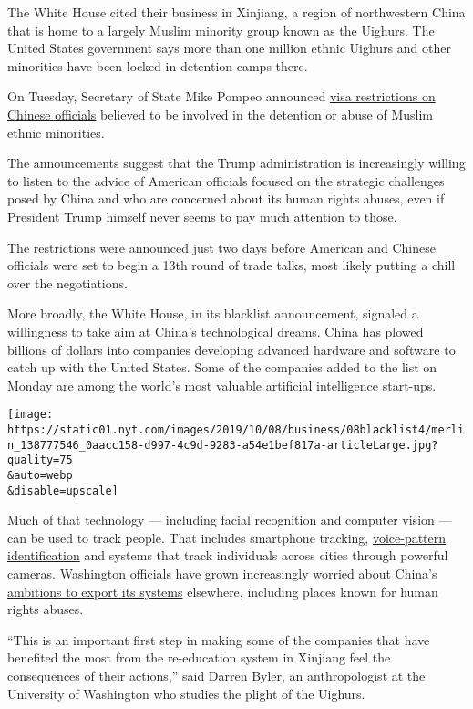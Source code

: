 The White House cited their business in Xinjiang, a region of
northwestern China that is home to a largely Muslim minority group known
as the Uighurs. The United States government says more than one million
ethnic Uighurs and other minorities have been locked in detention camps
there.

On Tuesday, Secretary of State Mike Pompeo announced
\href{https://www.state.gov/u-s-department-of-state-imposes-visa-restrictions-on-chinese-officials-for-repression-in-xinjiang/}{visa
restrictions on Chinese officials} believed to be involved in the
detention or abuse of Muslim ethnic minorities.

The announcements suggest that the Trump administration is increasingly
willing to listen to the advice of American officials focused on the
strategic challenges posed by China and who are concerned about its
human rights abuses, even if President Trump himself never seems to pay
much attention to those.

The restrictions were announced just two days before American and
Chinese officials were set to begin a 13th round of trade talks, most
likely putting a chill over the negotiations.

More broadly, the White House, in its blacklist announcement, signaled a
willingness to take aim at China's technological dreams. China has
plowed billions of dollars into companies developing advanced hardware
and software to catch up with the United States. Some of the companies
added to the list on Monday are among the world's most valuable
artificial intelligence start-ups.

\texttt{[image: https://static01.nyt.com/images/2019/10/08/business/08blacklist4/merlin\_138777546\_0aacc158-d997-4c9d-9283-a54e1bef817a-articleLarge.jpg?quality=75\\\&auto=webp\\\&disable=upscale]}

Much of that technology --- including facial recognition and computer
vision --- can be used to track people. That includes smartphone
tracking,
\href{https://www.nytimes.com/2017/12/03/business/china-artificial-intelligence.html}{voice-pattern
identification} and systems that track individuals across cities through
powerful cameras. Washington officials have grown increasingly worried
about China's
\href{https://www.nytimes.com/2019/04/24/technology/ecuador-surveillance-cameras-police-government.html}{ambitions
to export its systems} elsewhere, including places known for human
rights abuses.

``This is an important first step in making some of the companies that
have benefited the most from the re-education system in Xinjiang feel
the consequences of their actions,'' said Darren Byler, an
anthropologist at the University of Washington who studies the plight of
the Uighurs.

